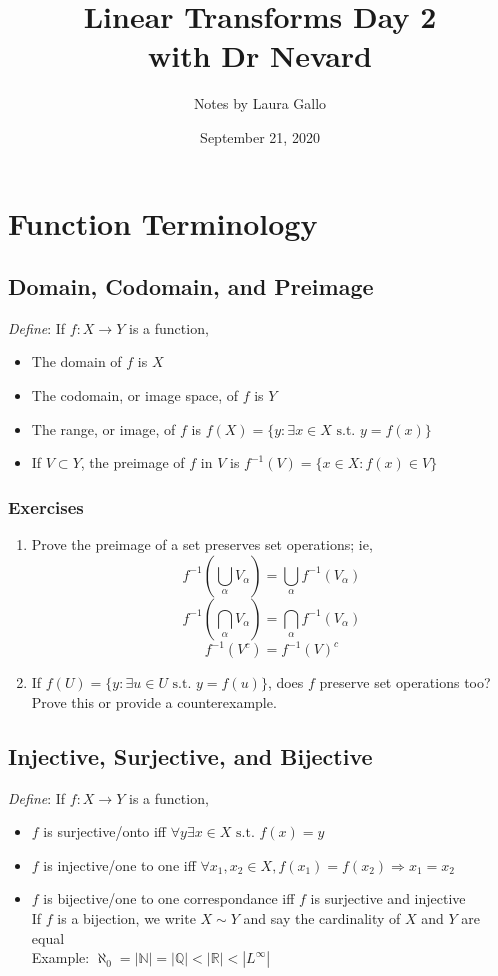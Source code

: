 \documentclass{article}
\title{Linear Transforms Day 2 \\ with Dr Nevard}
\author{Notes by Laura Gallo}
\date{September 21, 2020}
\newcommand{\st}{\text{ s.t. }}
\begin{document}
\maketitle

\section{Function Terminology}
\subsection{Domain, Codomain, and Preimage}
\emph{Define}: If $f: X\rightarrow Y$ is a function,
\begin{itemize}[label=--]
	\item The domain of $f$ is $X$
	\item The codomain, or image space, of $f$ is $Y$
	\item The range, or image, of $f$ is $f(X)=\{y:\exists x\in X \st y=f(x)\}$
	\item If $V \subset Y$, the preimage of $f$ in $V$ is $f^{-1}(V)=\{x\in X:f(x)\in V\}$
\end{itemize}

\subsubsection{Exercises}
\begin{enumerate}
	\item Prove the preimage of a set preserves set operations; ie,
		$$f^{-1}\left(\bigcup_\alpha V_\alpha\right)=\bigcup_\alpha f^{-1}(V_\alpha)$$
		$$f^{-1}\left(\bigcap_\alpha V_\alpha\right)=\bigcap_\alpha f^{-1}(V_\alpha)$$
		$$f^{-1}(V^c)=f^{-1}(V)^c$$

	\item If $f(U)=\{y:\exists u\in U \st y=f(u)\}$, does $f$ preserve set operations too? Prove this or provide a counterexample.
\end{enumerate}

\subsection{Injective, Surjective, and Bijective}
\emph{Define}: If $f: X\rightarrow Y$ is a function,
\begin{itemize}[label=--]
	\item $f$ is surjective/onto iff $\forall y \exists x \in X \st f(x)=y$
	\item $f$ is injective/one to one iff $\forall x_1,x_2 \in X, f(x_1)=f(x_2) \Rightarrow x_1=x_2$
	\item $f$ is bijective/one to one correspondance iff $f$ is surjective and injective \\
		If $f$ is a bijection, we write $X \sim Y$ and say the cardinality of $X$ and $Y$ are equal \\
		Example: $\aleph_0=|\mathbb{N}|=|\mathbb{Q}|<|\mathbb{R}|<|L^\infty |$
\end{itemize}
\end{document}
